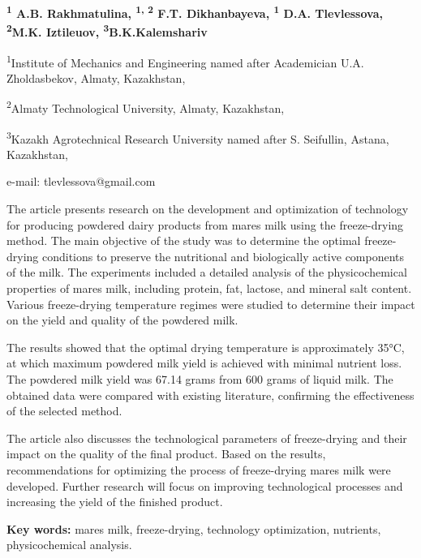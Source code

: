 \begin{center}

{\bfseries \textsuperscript{1} A.B. Rakhmatulina, \textsuperscript{1, 2}
F.T. Dikhanbayeva, \textsuperscript{1} D.A. Tlevlessova\envelope,}
{\bfseries \textsuperscript{2}M.K. Iztileuov, \textsuperscript{3}B.K.Kalemshariv}

\textsuperscript{1}Institute of Mechanics and Engineering named after
Academician U.A. Zholdasbekov, Almaty, Kazakhstan,

\textsuperscript{2}Almaty Technological University, Almaty, Kazakhstan,

\textsuperscript{3}Kazakh Agrotechnical Research University named after
S. Seifullin, Astana, Kazakhstan,

e-mail: tlevlessova@gmail.com
\end{center}

The article presents research on the development and optimization of
technology for producing powdered dairy products from
mare\textquotesingle s milk using the freeze-drying method. The main
objective of the study was to determine the optimal freeze-drying
conditions to preserve the nutritional and biologically active
components of the milk. The experiments included a detailed analysis of
the physicochemical properties of mare\textquotesingle s milk, including
protein, fat, lactose, and mineral salt content. Various freeze-drying
temperature regimes were studied to determine their impact on the yield
and quality of the powdered milk.

The results showed that the optimal drying temperature is approximately
35°C, at which maximum powdered milk yield is achieved with minimal
nutrient loss. The powdered milk yield was 67.14 grams from 600 grams of
liquid milk. The obtained data were compared with existing literature,
confirming the effectiveness of the selected method.

The article also discusses the technological parameters of freeze-drying
and their impact on the quality of the final product. Based on the
results, recommendations for optimizing the process of freeze-drying
mare\textquotesingle s milk were developed. Further research will focus
on improving technological processes and increasing the yield of the
finished product.

{\bfseries Key words:} mare\textquotesingle s milk, freeze-drying,
technology optimization, nutrients, physicochemical analysis.


